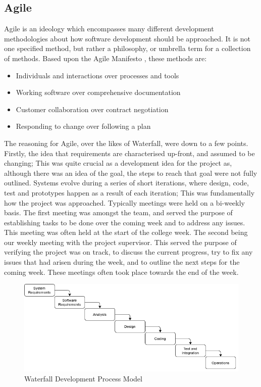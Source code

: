 \subsection{Agile}
Agile is an ideology which encompasses many different development methodologies about how software development should be approached. It is not one specified method, but rather a philosophy, or umbrella term for a collection of methods. Based upon the Agile Manifesto \cite{fowler2001agile}, these methods are:
\begin{itemize}
	\item Individuals and interactions over processes and tools
	\item Working software over comprehensive documentation
	\item Customer collaboration over contract negotiation
	\item Responding to change over following a plan
\end{itemize}
The reasoning for Agile, over the likes of Waterfall, were down to a few points. Firstly, the idea that requirements are characterised up-front, and assumed to be changing; This was quite crucial as a development idea for the project as, although there was an idea of the goal, the steps to reach that goal were not fully outlined. Systems evolve during a series of short iterations, where design, code, test and prototypes happen as a result of each iteration; This was fundamentally how the project was approached. Typically meetings were held on a bi-weekly basis. The first meeting was amongst the team, and served the purpose of establishing tasks to be done over the coming week and to address any issues. This meeting was often held at the start of the college week. The second being our weekly meeting with the project supervisor. This served the purpose of verifying the project was on track, to discuss the current progress, try to fix any issues that had arisen during the week, and to outline the next steps for the coming week. These meetings often took place towards the end of the week.

\begin{figure}[h!]
    \caption{Waterfall Development Process Model}
    \label{image:waterfallModel}
    \centering
    \includegraphics[width=1.0\textwidth]{images/WaterfallModel.png}
\end{figure}

